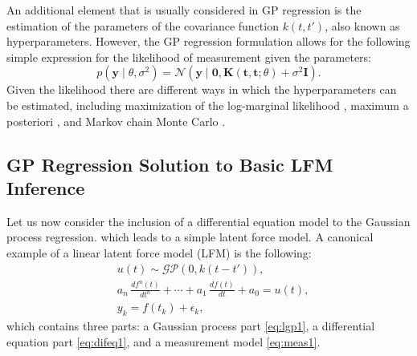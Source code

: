 \documentclass[journal]{IEEEtran}
\newcommand{\simo}[1]{{\color{red}#1}}
\begin{document}
An additional element that is usually considered in GP regression is the estimation of the parameters of the covariance
function $k(t,t')$, also known as hyperparameters. However, the GP regression formulation allows for the following simple expression for the likelihood of measurement given the parameters:
%
\begin{equation}
  p(\mathbf{y} \mid \theta,\sigma^2)
  = \mathcal{N}(\mathbf{y} \mid \mathbf{0}, \mathbf{K}(\mathbf{t}, \mathbf{t};\theta) + \sigma^2 \mathbf{I}).
\end{equation}
%
Given the likelihood there are different ways in which the hyperparameters can be estimated, including maximization of the log-marginal likelihood \cite{Rasmussen+Williams:2006}, maximum a posteriori \cite{Murphy:2012:MLP}, and Markov chain Monte Carlo \cite{FilipponeML13}. 

\subsection{GP Regression Solution to Basic LFM Inference}\label{sec:gp:regression:lfm}
%

Let us now consider the inclusion of a differential equation model to the Gaussian process regression. which leads to a simple latent force model. A canonical example of a linear latent force model (LFM) \cite{Alvarez+Luengo+Lawrence:2009,Alvarez+Luengo+Lawrence:2013} is the following:
%
\begin{eqnarray}
  &u(t) \sim \mathcal{GP}(0,k(t - t')), \label{eq:lgp1} \\
  &a_n \, \frac{df^{n}(t)}{dt^{n}} + \cdots
  + a_1 \, \frac{df(t)}{dt} + a_0 = u(t), \label{eq:difeq1} \\
  &y_k = f(t_k) + \epsilon_k, \label{eq:meas1}
\end{eqnarray}
%
which contains three parts: a Gaussian process part \eqref{eq:lgp1}, a differential equation part \eqref{eq:difeq1}, and a measurement model \eqref{eq:meas1}. 
\end{document}
